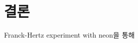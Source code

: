 \documentclass[a4paper, 10pt, nanum]{CSUniSchoolLabReport}
\begin{document}

\section{결론}

	Franck-Hertz experiment with neon을 통해 



\end{document}

